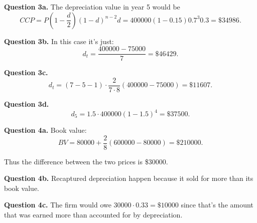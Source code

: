 \documentclass[letterpaper, reqno,11pt]{article}
\begin{document}
{\noindent\bf Question 3a.} The depreciation value in year 5 would be 
\[
CCP=P (1-\frac{d}{2})(1-d)^{n-2}d=400000 (1-0.15)0.7^{3}0.3=\$34986
.\]

{\noindent\bf Question 3b.} In this case it's just: 
\[
d_t=\frac{400000-75000}{7}=\$46429
.\]

{\noindent\bf Question 3c.} 
\[
d_t=(7-5-1)\cdot \frac{2}{7\cdot 8}(400000-75000)=\$11607
.\]

{\noindent\bf Question 3d.} 
\[
d_5=1.5\cdot 400000 \left( 1-1.5 \right)^{4}=\$37500
.\]

{\noindent\bf Question 4a.} Book value: 
\[
BV=80000 + \frac{2}{8}\left( 600000-80000 \right) =\$210000
.\]

Thus the difference between the two prices is \$30000. 

{\noindent\bf Question 4b.} Recaptured depreciation happen because it sold for more than its book value. 

{\noindent\bf Question 4c.} The firm would owe $30000\cdot 0.33=\$10000$ since that's the amount that was earned more than accounted for by depreciation. 
\end{document}
